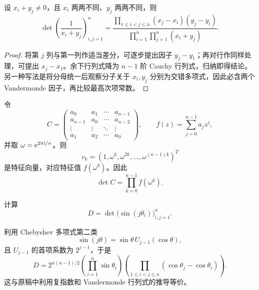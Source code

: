 \begin{theorem}
设 $x_i+y_j\neq0$，且 $x_i$ 两两不同、$y_j$ 两两不同，则
\begin{equation}
 \det\left(\frac{1}{x_i+y_j}\right)_{i,j=1}^n
 =
 \frac{
 \displaystyle\prod_{1\leq i<j\leq n}(x_j-x_i)(y_j-y_i)}
 {\displaystyle\prod_{i=1}^n\prod_{j=1}^n(x_i+y_j)}.
\end{equation}
\end{theorem}

\begin{proof}
将第 $j$ 列与第一列作适当差分，可逐步提出因子 $y_j-y_1$；再对行作同样处理，可提出 $x_j-x_1$。余下行列式降为 $n-1$ 阶 Cauchy 行列式，归纳即得结论。另一种写法是将分母统一后观察分子关于 $x_i,y_j$ 分别为交错多项式，因此必含两个 Vandermonde 因子，再比较最高次项常数。
\end{proof}

\begin{theorem}[循环矩阵的特征值]
令
\begin{equation}
 C=\begin{pmatrix}
 a_0&a_1&\cdots&a_{n-1}\\
 a_{n-1}&a_0&\cdots&a_{n-2}\\
 \vdots&\vdots&\ddots&\vdots\\
 a_1&a_2&\cdots&a_0
 \end{pmatrix},
 \qquad
 f(z)=\sum_{j=0}^{n-1}a_jz^j,
\end{equation}
并取 $\omega=\mathrm e^{2\pi\mathrm i/n}$。则
\begin{equation}
 v_k=(1,\omega^k,\omega^{2k},\ldots,\omega^{(n-1)k})^T
\end{equation}
是特征向量，对应特征值 $f(\omega^k)$。因此
\begin{equation}
 \det C=\prod_{k=0}^{n-1}f(\omega^k).
\end{equation}
\end{theorem}

\begin{exercise}[正弦行列式]
计算
\begin{equation}
 D=\det\bigl(\sin(j\theta_i)\bigr)_{i,j=1}^n.
\end{equation}
\end{exercise}

\begin{solution}
利用 Chebyshev 多项式第二类
\begin{equation}
 \sin(j\theta)=\sin\theta\,U_{j-1}(\cos\theta),
\end{equation}
且 $U_{j-1}$ 的首项系数为 $2^{j-1}$，于是
\begin{equation}
 D
 =2^{n(n-1)/2}
 \left(\prod_{i=1}^n\sin\theta_i\right)
 \left(\prod_{1\leq i<j\leq n}(\cos\theta_j-\cos\theta_i)\right).
\end{equation}
这与原稿中利用复指数和 Vandermonde 行列式的推导等价。
\end{solution}

